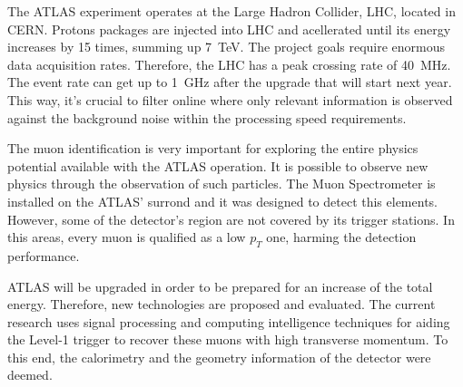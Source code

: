 \begin{foreignabstract}


The ATLAS experiment operates at the Large Hadron Collider, LHC, located in
CERN. Protons packages are injected into LHC and acellerated until its energy
increases by 15 times, summing up 7~TeV. The project goals require enormous data
acquisition rates. Therefore, the LHC has a peak crossing rate of 40~MHz. The
event rate can get up to 1~GHz after the upgrade that will start next year. This
way, it's crucial to filter online where only relevant information is observed
against the background noise within the processing speed requirements.

The muon identification is very important for exploring the entire physics
potential available with the ATLAS operation. It is possible to observe new
physics through the observation of such particles. The Muon Spectrometer is
installed on the ATLAS' surrond and it was designed to detect this elements.
However, some of the detector's region are not covered by its trigger stations.
In this areas, every muon is qualified as a low $p_T$ one, harming the detection
performance.

ATLAS will be upgraded in order to be prepared for an increase of the total
energy. Therefore, new technologies are proposed and evaluated. The current
research uses signal processing and computing intelligence techniques for aiding
the Level-1 trigger to recover these muons with high transverse momentum. To
this end, the calorimetry and the geometry information of the detector were
deemed.

\end{foreignabstract}

